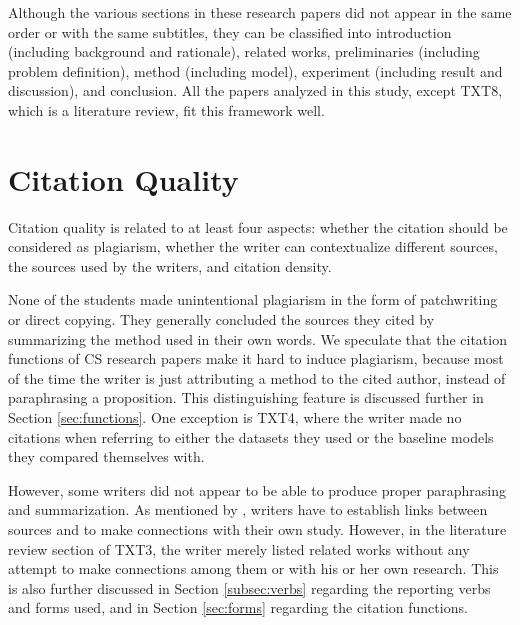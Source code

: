 Although the various sections in these research papers did not appear in the same order or with the same subtitles, they can be classified into introduction (including background and rationale), related works, preliminaries (including problem definition), method (including model), experiment (including result and discussion), and conclusion. All the papers analyzed in this study, except TXT8, which is a literature review, fit this framework well.

\section{Citation Quality}
\label{sec:quality}

Citation quality is related to at least four aspects: whether the citation should be considered as plagiarism, whether the writer can contextualize different sources, the sources used by the writers, and citation density.

None of the students made unintentional plagiarism in the form of patchwriting or direct copying. They generally concluded the sources they cited by summarizing the method used in their own words. We speculate that the citation functions of CS research papers make it hard to induce plagiarism, because most of the time the writer is just attributing a method to the cited author, instead of paraphrasing a proposition. This distinguishing feature is discussed further in Section \ref{sec:functions}. One exception is TXT4, where the writer made no citations when referring to either the datasets they used or the baseline models they compared themselves with.

However, some writers did not appear to be able to produce proper paraphrasing and summarization. As mentioned by \citep{hyland_representing_2005}, writers have to establish links between sources and to make connections with their own study. However, in the literature review section of TXT3, the writer merely listed related works without any attempt to make connections among them or with his or her own research. This is also further discussed in Section \ref{subsec:verbs} regarding the reporting verbs and forms used, and in Section \ref{sec:forms} regarding the citation functions.

